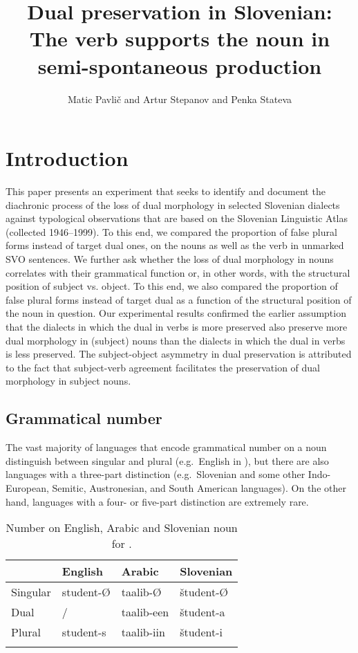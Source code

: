 \documentclass[output=paper,colorlinks,citecolor=brown]{langscibook}
\author{Matic Pavlič\orcid{}\affiliation{Faculty of Education -- University of Ljubljana} and Artur Stepanov\orcid{}\affiliation{Center for Cognitive Science of Language -- University of Nova Gorica} and Penka Stateva\orcid{}\affiliation{Center for Cognitive Science of Language -- University of Nova Gorica}}
\title[Dual preservation in Slovenian]{Dual preservation in Slovenian: The verb supports the noun in semi-spontaneous production }
\begin{document}
\maketitle

%

\section{Introduction}\label{pav:sec:introduction}
This paper presents an experiment that seeks to identify and document  the diachronic process of the loss of dual morphology in selected Slovenian dialects against  typological observations that are based on the Slovenian Linguistic Atlas (collected 1946--1999). To this end, we compared the proportion of false plural forms instead of target dual ones, on the nouns as well as the verb in unmarked SVO sentences. We further ask whether the loss of dual morphology in nouns correlates with their grammatical function or, in other words, with the structural position of subject vs. object. To this end, we also compared the proportion of false plural forms instead of target dual as a function of the structural position of the noun in question. Our experimental results confirmed the earlier assumption that the dialects in which the dual in verbs is more preserved also preserve more dual morphology in (subject) nouns than the dialects in which the dual in verbs is less preserved. The subject-object asymmetry in dual preservation is attributed to the fact that subject-verb agreement facilitates the preservation of dual morphology in subject nouns.

\subsection{Grammatical number}\label{pav:sec:number}
The vast majority of languages that encode grammatical number on a noun distinguish between singular and plural (e.g.\, English in ), but there are also languages with a three-part distinction (e.g.\, Slovenian and some other Indo-European, Semitic, Austronesian, and South American languages). On the other hand, languages with a four- or five-part distinction are extremely rare.


\begin{table}
    \begin{tabular}{l lll}
    \lsptoprule
                & {English}  & {Arabic}       & {Slovenian} \\
    \midrule
     Singular   &student-Ø  &taalib-Ø    &študent-Ø \\
     Dual       &/          &taalib-een  &študent-a \\
     Plural     &student-s  &taalib-iin  &študent-i \\
     \lspbottomrule
    \end{tabular}
    \caption{Number on English, Arabic and Slovenian noun for .}
    \label{tab:pav:01}
\end{table}
\end{document}
